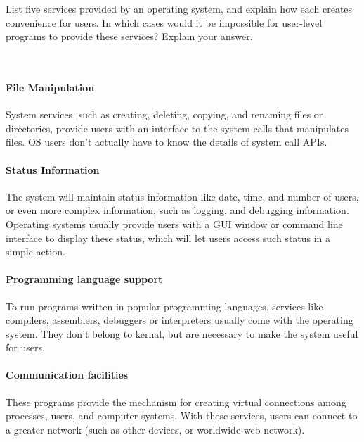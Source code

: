 \begin{exercise}[]{List five services provided by an operating system, and explain how each
    creates convenience for users. In which cases would it be impossible for
    user-level programs to provide these services? Explain your answer.}
  \begin{solution}
    \par{~}

      \paragraph{File Manipulation} System services, such as creating, deleting, copying, and renaming files or directories, provide users with an interface to the system calls that manipulates files. OS users don't actually have to know the details of system call APIs.

      \paragraph{Status Information} The system will maintain status information like date, time, and number of users, or even more complex information, such as logging, and debugging information. Operating systems usually provide users with a GUI window or command line interface to display these status, which will let users access such status in a simple action.
      
      \paragraph{Programming language support} To run programs written in popular programming languages, services like compilers, assemblers, debuggers or interpreters usually come with the operating system. They don’t belong to kernal, but are necessary to make the system useful for users.

      \paragraph{Communication facilities} These programs provide the mechanism for creating virtual connections among processes, users, and computer systems. With these services, users can connect to a greater network (such as other devices, or worldwide web network).


\end{solution}
\end{exercise}
